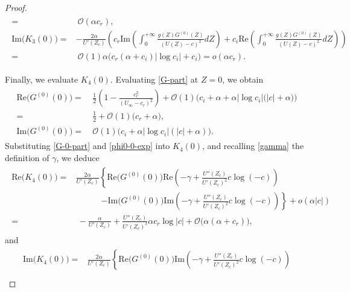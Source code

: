 \documentclass[reqno,11pt]{amsart}
\numberwithin{equation}{section}
\numberwithin{equation}{section}
\theoremstyle{plain}
\begin{document}
\begin{proof}
\begin{align}
\begin{aligned}
					=&~\mathcal{O}(\alpha c_r),\\
					\text{Im}\big(K_3(0)\big) =& -\frac{2\alpha}{U'(Z_c)}\left(c_r\text{Im}\left(\int_{0}^{+\infty}\frac{g(Z)G^{(0)}(Z)}{(U(Z)-c)^2}dZ\right) +c_i\text{Re}\left(\int_{0}^{+\infty}\frac{g(Z)G^{(0)}(Z)}{(U(Z)-c)^2}dZ\right) \right)\\
					=&~\mathcal{O}(1)\alpha\Big(c_r(\alpha+c_i)|\log c_i|+c_i\Big)=o(\alpha c_r).
			\end{aligned}\end{align}
		
		
Finally, we evaluate $K_4(0)$. Evaluating \eqref{G-part} at $Z=0$, we obtain 
			\begin{align}\label{G-0-part}\begin{aligned}
					\text{Re}\big( G^{(0)}(0)\big)= &~ \frac{1}{2}\left(1-\frac{c_r^2}{(U_\infty-c_r)^2}\right) +\mathcal{O}(1)\Big(c_i+\alpha+\alpha|\log c_i|\big(|c|+\alpha\big)\Big)\\
					=&~\frac{1}{2}+\mathcal{O}(1)\big(c_r+\alpha\big),\\%
					\text{Im}\big( G^{(0)}(0)\big)
					=&~\mathcal{O}(1)\big(c_i+\alpha|\log c_i|(|c|+\alpha)\big).
			\end{aligned}\end{align}
Substituting \eqref{G-0-part} and \eqref{phi0-0-exp} into $K_4(0)$, and recalling \eqref{gamma} the definition of $\gamma$, we deduce
			\begin{align}\label{K4-0-im}\begin{aligned}
					\text{Re}\big(K_4(0)\big) =& \frac{2\alpha}{U'(Z_c)}\left\{\text{Re}\big(G^{(0)}(0)\big) \text{Re}\left(-\gamma+\frac{U''(Z_c)}{U'(Z_c)^2}c\log(-c)\right)\right.\\
					&\qquad\quad \left.-\text{Im}\big(G^{(0)}(0)\big) \text{Im}\left(-\gamma+\frac{U''(Z_c)}{U'(Z_c)^2}c\log(-c)\right)\right\}+o(\alpha|c|)\\
					=&~-\frac{\alpha}{U'(Z_c)}+\frac{U''(Z_c)}{U'(Z_c)^3} \alpha c_r\log|c|+\mathcal{O}\big(\alpha (\alpha+c_r)\big),
			\end{aligned}
		\end{align}
	and
	\begin{align}\begin{aligned}\label{K4-0-re}
					\text{Im}\big(K_4(0)\big) =& \frac{2\alpha}{U'(Z_c)}\left\{\text{Re}\big(G^{(0)}(0)\big) \text{Im}\left(-\gamma+\frac{U''(Z_c)}{U'(Z_c)^2}c\log(-c)\right)\right.\\

\end{aligned}
\end{align}
\end{proof}
\end{document}
